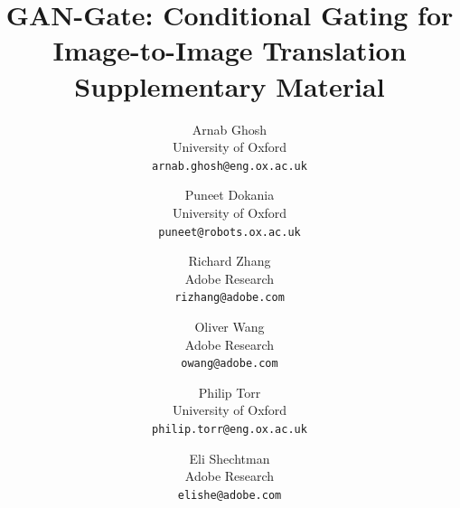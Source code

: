 \documentclass[10pt,twocolumn,letterpaper]{article}
\begin{document}
\title{GAN-Gate: Conditional Gating for Image-to-Image Translation \\ Supplementary Material}

\author{Arnab Ghosh\\
University of Oxford\\
{\tt\small arnab.ghosh@eng.ox.ac.uk}
\and
Puneet Dokania\\
University of Oxford\\
{\tt\small puneet@robots.ox.ac.uk}
\and
Richard Zhang\\
Adobe Research\\
{\tt\small rizhang@adobe.com}
\and
Oliver Wang\\
Adobe Research\\
{\tt\small owang@adobe.com}
\and
Philip Torr\\
University of Oxford\\
{\tt\small philip.torr@eng.ox.ac.uk}
\and
Eli Shechtman\\
Adobe Research\\
{\tt\small elishe@adobe.com}
}

\maketitle


    
\end{document}
